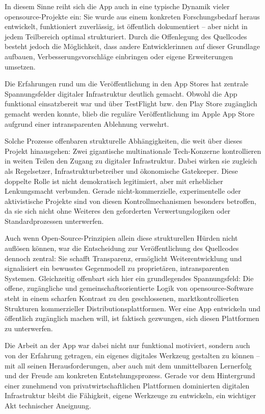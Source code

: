 In diesem Sinne reiht sich die App auch in eine typische Dynamik vieler \gls{opensource}-Projekte ein: Sie wurde aus einem konkreten Forschungsbedarf heraus entwickelt, funktioniert zuverlässig, ist öffentlich dokumentiert – aber nicht in jedem Teilbereich optimal strukturiert. Durch die Offenlegung des Quellcodes besteht jedoch die Möglichkeit, dass andere Entwickler\genderstern innen auf dieser Grundlage aufbauen, Verbesserungsvorschläge einbringen oder eigene Erweiterungen umsetzen.

Die Erfahrungen rund um die Veröffentlichung in den App Stores hat zentrale Spannungsfelder digitaler Infrastruktur deutlich gemacht. Obwohl die App funktional einsatzbereit war und über TestFlight bzw. den Play Store zugänglich gemacht werden konnte, blieb die reguläre Veröffentlichung im Apple App Store aufgrund einer intransparenten Ablehnung verwehrt.

Solche Prozesse offenbaren strukturelle Abhängigkeiten, die weit über dieses Projekt hinausgehen: Zwei gigantische multinationale Tech-Konzerne kontrollieren in weiten Teilen den Zugang zu digitaler Infrastruktur. Dabei wirken sie zugleich als Regelsetzer, Infrastrukturbetreiber und ökonomische Gatekeeper. Diese doppelte Rolle ist nicht demokratisch legitimiert, aber mit erheblicher Lenkungsmacht verbunden. Gerade nicht-kommerzielle, experimentelle oder aktivistische Projekte sind von diesen Kontrollmechanismen besonders betroffen, da sie sich nicht ohne Weiteres den geforderten Verwertungslogiken oder Standardprozessen unterwerfen.

Auch wenn Open-Source-Prinzipien allein diese strukturellen Hürden nicht auflösen können, war die Entscheidung zur Veröffentlichung des Quellcodes dennoch zentral: Sie schafft Transparenz, ermöglicht Weiterentwicklung und signalisiert ein bewusstes Gegenmodell zu proprietären, intransparenten Systemen. Gleichzeitig offenbart sich hier ein grundlegendes Spannungsfeld: Die offene, zugängliche und gemeinschaftsorientierte Logik von \gls{opensource}-Software steht in einem scharfen Kontrast zu den geschlossenen, marktkontrollierten Strukturen kommerzieller Distributionsplattformen. Wer eine App entwickeln und öffentlich zugänglich machen will, ist faktisch gezwungen, sich diesen Plattformen zu unterwerfen.

Die Arbeit an der App war dabei nicht nur funktional motiviert, sondern auch von der Erfahrung getragen, ein eigenes digitales Werkzeug gestalten zu können – mit all seinen Herausforderungen, aber auch mit dem unmittelbaren Lernerfolg und der Freude am konkreten Entstehungsprozess. Gerade vor dem Hintergrund einer zunehmend von privatwirtschaftlichen Plattformen dominierten digitalen Infrastruktur bleibt die Fähigkeit, eigene Werkzeuge zu entwickeln, ein wichtiger Akt technischer Aneignung.